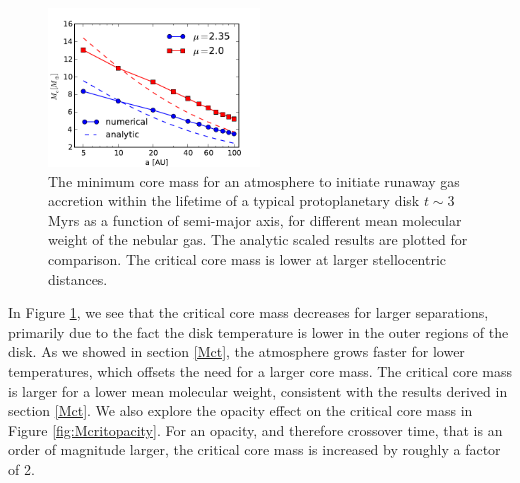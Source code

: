 \documentclass[apj]{emulateapj}
\begin{document}
\begin{figure}[h]
\centering
\includegraphics[width=0.5\textwidth]{../../figs/ModelAtmospheres/RadSelfGravPoly/PaperFigs/Mcrit_vs_a_3Myrs_new.pdf}
\caption{The minimum core mass for an atmosphere to initiate runaway gas accretion within the lifetime of a typical protoplanetary disk $t \sim 3$ Myrs as a function of semi-major axis, for different mean molecular weight of the nebular gas. The analytic scaled results are plotted for comparison. The critical core mass is lower at larger stellocentric distances.}
\label{fig:Mcvsa}
\end{figure}

 In Figure \ref{fig:Mcvsa}, we see that the critical core mass decreases for larger separations, primarily due to the fact the disk temperature is lower in the outer regions of the disk. As we showed in section \ref{Mct}, the atmosphere grows faster for lower temperatures, which offsets the need for a larger core mass. The critical core mass is larger for a lower mean molecular weight, consistent with the results derived in section \ref{Mct}. We also explore the opacity effect on the critical core mass in Figure \ref{fig:Mcritopacity}. For an opacity, and therefore crossover time, that is an order of magnitude larger, the critical core mass is increased by roughly a factor of 2. 
\end{document}
